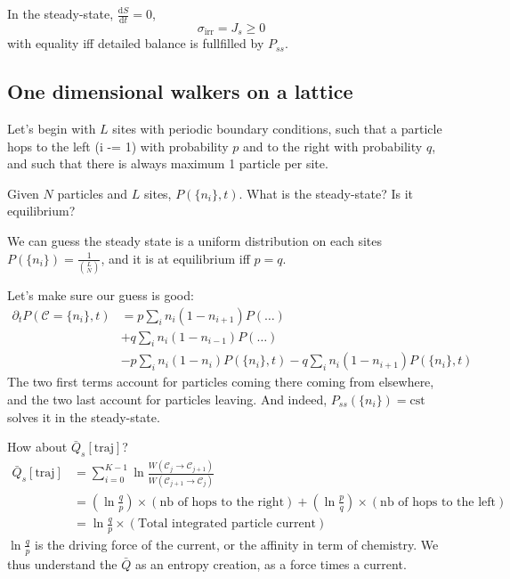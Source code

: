 \documentclass[a4paper]{book}
\theoremstyle{definition}
\theoremstyle{remark}
\begin{document}
In the steady-state, $\frac{\text{d}S}{\text{d}t} = 0$, 
\begin{equation}
    \sigma_{\text{irr}} = J_s \geq 0
\end{equation}
with equality iff detailed balance is fullfilled by $P_{ss}$.

\subsection{One dimensional walkers on a lattice}

Let's begin with $L$ sites with periodic boundary conditions, such that a particle hops to the left (i -= 1) with probability $p$ and to the right with probability $q$, and such that there is always maximum 1 particle per site. \par \medskip 

Given $N$ particles and $L$ sites, $P(\{n_i\}, t)$. What is the steady-state? Is it equilibrium? \par \medskip 

We can guess the steady state is a uniform distribution on each sites $P(\{n_i\}) = \frac{1}{\binom{L}{N}}$, and it is at equilibrium iff $p = q$. 

Let's make sure our guess is good: 
\begin{equation}
    \begin{aligned}
        \partial_t P(\mathscr{C}= \{n_i\}, t) &= p \sum_i n_i(1- n_{i+1}) P(\dots) \\ 
        &+ q \sum_i n_i (1 - n_{i-1}) P(\dots) \\ 
        &- p \sum_i n_i (1-n_i) P(\{n_i\}, t) - q \sum_i n_i (1 - n_{i+1})P(\{n_i\}, t)
    \end{aligned}
\end{equation}
The two first terms account for particles coming there coming from elsewhere, and the two last account for particles leaving. And indeed, $P_{ss}(\{n_i\}) = \text{cst}$ solves it in the steady-state. \par \medskip 

How about $\bar{Q}_s[\text{traj}]$?
\begin{equation}
    \begin{aligned}
        \bar{Q}_s[\text{traj}] &= \sum_{i=0}^{K-1}\ln \frac{W(\mathscr{C}_j \rightarrow \mathscr{C}_{j+1})}{W(\mathscr{C}_{j+1} \rightarrow \mathscr{C}_j)} \\ 
        &= \left(\ln \frac{q}{p}\right) \times (\text{nb of hops to the right}) + \left(\ln \frac{p}{q}\right) \times (\text{nb of hops to the left}) \\ 
        &= \ln \frac{q}{p} \times \left(\text{Total integrated particle current}\right)
    \end{aligned}
\end{equation} 
$\ln \frac{q}{p}$ is the driving force of the current, or the affinity in term of chemistry. We thus understand the $\bar{Q}$ as an entropy creation, as a force times a current. \par \medskip 
\end{document}
